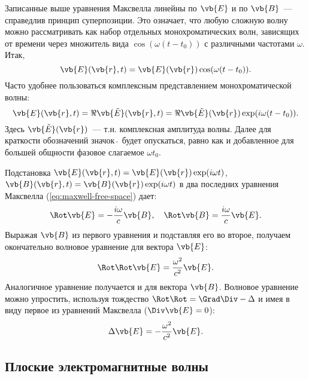 \documentclass[\docroot/reports/lectures-draft/report.tex]{subfiles}
\begin{document}
    Записанные выше уравнения Максвелла линейны по $\vb{E}$ и по $\vb{B}$~--- справедлив принцип суперпозиции. Это означает, что любую сложную волну можно рассматривать как набор отдельных монохроматических волн, зависящих от времени через множитель вида $\cos(\omega (t - t_0))$ с различными частотами $\omega$. Итак,
    \begin{equation*}
        \vb{E}(\vb{r},t) = \vb{E}(\vb{r}) \cos(\omega (t - t_0)) .
    \end{equation*}
    Часто удобнее пользоваться комплексным представлением монохроматической волны:
    \begin{equation*}
        \vb{E}(\vb{r},t) = \Re{\vb{\tilde{E}}(\vb{r},t)} = \Re{\vb{\tilde{E}}(\vb{r}) \exp(i \omega (t - t_0))} .
    \end{equation*}
    Здесь $\vb{\tilde{E}}(\vb{r})$~--- т.н. комплексная амплитуда волны. Далее для краткости обозначений значок $\tilde{\ }$ будет опускаться, равно как и добавленное для большей общности фазовое слагаемое $\omega t_0$.

    Подстановка $\vb{E}(\vb{r},t) = \vb{E}(\vb{r}) \exp(i \omega t)$, $\vb{B}(\vb{r},t) = \vb{B}(\vb{r}) \exp(i \omega t)$ в два последних уравнения Максвелла (\autoref{eq:maxwell-free-space}) дает:
    \begin{equation*}
        \Rot \vb{E} = - \frac{i \omega}{c} \vb{B} , \quad
        \Rot \vb{B} = \frac{i \omega}{c} \vb{E} .
    \end{equation*}
    Выражая $\vb{B}$ из первого уравнения и подставляя его во второе, получаем окончательно волновое уравнение для вектора $\vb{E}$:
    \begin{equation}\label{eq:waweeq-rot}
        \Rot\Rot \vb{E} = \frac{\omega^2}{c^2} \vb{E} .
    \end{equation}
    Аналогичное уравнение получается и для вектора $\vb{B}$. Волновое уравнение можно упростить, используя тождество $\Rot\Rot = \Grad\Div - \Delta$ и имея в виду первое из уравнений Максвелла ($\Div \vb{E} = 0$):
    \begin{equation}\label{eq:waweeq-lap}
        \Delta \vb{E} = - \frac{\omega^2}{c^2} \vb{E} .
    \end{equation}

\subsection{Плоские электромагнитные волны}
\end{document}
